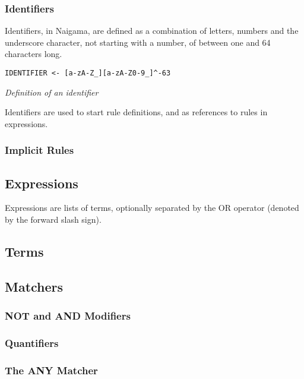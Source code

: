 \subsubsection{Identifiers}

Identifiers, in Naigama, are defined as a combination of letters,
numbers and the underscore character, not starting with a number,
of between one and 64 characters long.

\begin{myquote}
\begin{verbatim}
IDENTIFIER <- [a-zA-Z_][a-zA-Z0-9_]^-63

\end{verbatim}
\end{myquote}
\textit{Definition of an identifier}

Identifiers are used to start rule definitions, and as references
to rules in expressions.

\subsubsection{Implicit Rules}

\subsection{Expressions}

Expressions are lists of terms, optionally separated by the
OR operator (denoted by the forward slash sign).

\subsection{Terms}

\subsection{Matchers}

\subsubsection{NOT and AND Modifiers}

\subsubsection{Quantifiers}

\subsubsection{The ANY Matcher}

